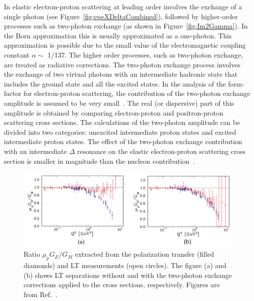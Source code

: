 In elastic electron-proton scattering at leading order involves the exchange of a single photon (see Figure~\ref{fig:epeXDeltaCombined}), followed by higher-order processes such as two-photon exchange (as shown in Figure~\ref{fig:Im2Gamma}).
In the Born approximation this is usually approximated as a one-photon. This approximation is possible due to the small value of the electromagnetic coupling constant $\alpha\sim$ 1/137. The higher order processes, such as two-photon exchange, are treated as radiative corrections. The two-photon exchange process involves the exchange of two virtual photons with an intermediate hadronic state that includes the ground state and all the excited states. 
In the analysis of the form-factor for electron-proton scattering, the contribution of the two-photon exchange amplitude is assumed to be very small~\cite{PhysRev.184.1860}. The real (or dispersive) part of this amplitude is obtained by comparing electron-proton and positron-proton scattering cross sections.
The calculations of the two-photon amplitude can be divided into two categories: unexcited intermediate proton states and excited intermediate proton states. 
The effect of the two-photon exchange contribution with an intermediate $\Delta$ resonance on the elastic electron-proton scattering cross section is smaller in magnitude than the nucleon contribution~\cite{PhysRevLett.95.172503}.

\begin{figure}[h]
	\begin{center}
	\includegraphics[width=15.0cm]{figures/RosenbluthPolarizationTransfer}
	\end{center}
	\caption
	{Ratio $\mu_{p}G_{E}/G_{M}$ extracted from the polarization transfer (filled diamonds) and LT measurements (open circles). The figure (a) and (b) shows LT separations without and with the two-photon exchange corrections applied to the cross sections, respectively. Figures are from Ref.~\cite{PhysRevC.76.035205}.}
	\label{fig:RosenbluthPolarizationTransfer}
\end{figure}

